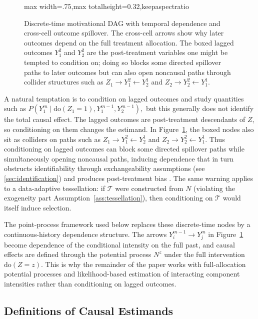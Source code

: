 \documentclass{statsoc}
\newcommand{\1}{\mathbbm{1}}
\newcommand{\Nproc}{N}
\begin{document}
\begin{figure}[!t]
\begin{adjustbox}{max width=.75\linewidth,max totalheight=0.32\textheight,keepaspectratio}
\begin{tikzpicture}[
    scale=0.92,
    transform shape,
    ->, >=Stealth,
    node distance=2.1cm,
    every node/.style={font=\small},
    lagged/.style={rectangle, draw, rounded corners, inner sep=2pt}
]
\end{tikzpicture}
\end{adjustbox}
\caption{Discrete-time motivational DAG with temporal dependence and cross-cell outcome spillover. The cross-cell arrows show why later outcomes depend on the full treatment allocation. The boxed lagged outcomes \(Y_1^2\) and \(Y_2^2\) are the post-treatment variables one might be tempted to condition on; doing so blocks some directed spillover paths to later outcomes but can also open noncausal paths through collider structures such as \(Z_1\to Y_1^2\leftarrow Y_2^1\) and \(Z_2\to Y_2^2\leftarrow Y_1^1\).}
\label{fig:dag_2}
\end{figure}




A natural temptation is to condition on lagged outcomes and study quantities such as
\(
P\!\left(Y_1^m\mid \mathrm{do}(Z_1=1),Y_1^{m-1},Y_2^{m-1}\right),
\)
but this generally does not identify the total causal effect. The lagged outcomes are post-treatment descendants of \(Z\), so conditioning on them changes the estimand. In Figure~\ref{fig:dag_2}, the boxed nodes also sit as colliders on paths such as \(Z_1\to Y_1^2\leftarrow Y_2^1\) and \(Z_2\to Y_2^2\leftarrow Y_1^1\). Thus conditioning on lagged outcomes can block some directed spillover paths while simultaneously opening noncausal paths, inducing dependence that in turn obstructs identifiability through exchangeability assumptions (see \cref{sec:identification}) and produces post-treatment bias \citep{elwert2014endogenous}.%
 The same warning applies to a data-adaptive tessellation: if \(\mathcal T\) were constructed from \(\Nproc\) (violating the exogeneity part Assumption~\ref{ass:tessellation}), then conditioning on \(\mathcal T\) would itself induce selection.





The point-process framework used below replaces these discrete-time nodes by a continuous-history dependence structure. The arrows \(Y_i^{m-1}\to Y_j^m\) in Figure~\ref{fig:dag_2} become dependence of the conditional intensity on the full past, and causal effects are defined through the potential process \(\Nproc^z\) under the full intervention \(\mathrm{do}(Z=z)\). This is why the remainder of the paper works with full-allocation potential processes and likelihood-based estimation of interacting component intensities rather than conditioning on lagged outcomes.

\subsection{Definitions of Causal Estimands}\label{sec:causalEstimands}
\end{document}
